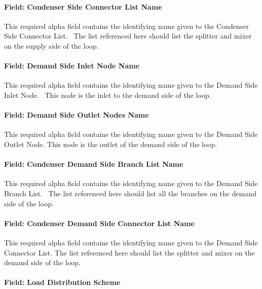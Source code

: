 \paragraph{Field: Condenser Side Connector List Name}\label{field-condenser-side-connector-list-name}

This required alpha field contains the identifying name given to the Condenser Side Connector List.~ The list referenced here should list the splitter and mixer on the supply side of the loop.

\paragraph{Field: Demand Side Inlet Node Name}\label{field-demand-side-inlet-node-name-1}

This required alpha field contains the identifying name given to the Demand Side Inlet Node.~ This node is the inlet to the demand side of the loop.

\paragraph{Field: Demand Side Outlet Nodes Name}\label{field-demand-side-outlet-nodes-name}

This required alpha field contains the identifying name given to the Demand Side Outlet Node. This node is the outlet of the demand side of the loop.

\paragraph{Field: Condenser Demand Side Branch List Name}\label{field-condenser-demand-side-branch-list-name}

This required alpha field contains the identifying name given to the Demand Side Branch List.~ The list referenced here should list all the branches on the demand side of the loop.

\paragraph{Field: Condenser Demand Side Connector List Name}\label{field-condenser-demand-side-connector-list-name}

This required alpha field contains the identifying name given to the Demand Side Connector List. The list referenced here should list the splitter and mixer on the demand side of the loop.

\paragraph{Field: Load Distribution Scheme}\label{field-load-distribution-scheme-1-000}

